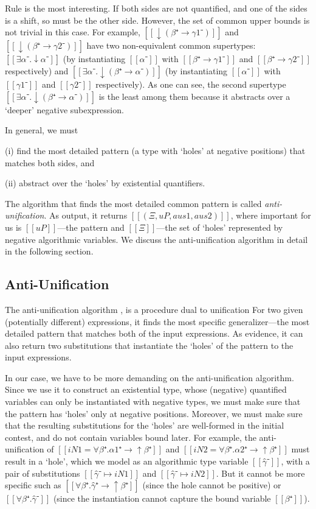 Rule  is the most 
interesting. If both sides are not quantified, and one of the sides is 
a shift, so must be the other side. 
However, the set of common upper bounds is not trivial in this case.
For example, $[[↓(β⁺ → γ1⁻)]]$ and $[[↓(β⁺ → γ2⁻)]]$ have
two non-equivalent common supertypes: 
$[[∃α⁻.↓α⁻]]$ 
(by instantiating $[[α⁻]]$ with $[[β⁺ → γ1⁻]]$ and $[[β⁺ → γ2⁻]]$ respectively)
and 
$[[∃α⁻.↓(β⁺ → α⁻)]]$ 
(by instantiating $[[α⁻]]$ with $[[γ1⁻]]$ and $[[γ2⁻]]$ respectively).
As one can see, the second supertype $[[∃α⁻.↓(β⁺ → α⁻)]]$ is the least among them
because it abstracts over a `deeper' negative subexpression.

In general, we must 
\begin{itemize*}
  \item[(i)] find the most detailed pattern (a type with `holes' at negative positions) 
    that matches both sides, and 
  \item[(ii)] abstract over the `holes' by existential quantifiers.
\end{itemize*}
The algorithm that finds the most detailed common pattern is called \emph{anti-unification}.
As output, it returns $[[(Ξ, uP, aus1, aus2)]]$, where important for us is
$[[uP]]$---the pattern and $[[Ξ]]$---the set of `holes' represented by negative algorithmic variables.
We discuss the anti-unification algorithm in detail in the following section.


\subsection{Anti-Unification}

The anti-unification algorithm \cite{todo}, 
is a procedure dual to unification
For two given (potentially different) expressions, 
it finds the most specific generalizer---the most detailed pattern that 
matches both of the input expressions. As evidence, it can also return 
two substitutions that instantiate the `holes' of the pattern to the input expressions.

In our case, we have to be more demanding on the anti-unification algorithm.
Since we use it to construct an existential type, whose (negative) quantified variables
can only be instantiated with negative types, we must make sure that the pattern 
has `holes' only at negative positions. Moreover, we must make sure that
the resulting substitutions for the `holes' are well-formed in the initial contest, 
and do not contain variables bound later. For example, 
the anti-unification of $[[iN1 = ∀β⁺.α1⁺ → ↑β⁺]]$ and
$[[iN2 = ∀β⁺.α2⁺ → ↑β⁺]]$
must result in a `hole', which we model as an algorithmic type variable $[[γ̂⁻]]$, 
with a pair of substitutions $[[γ̂⁻ ↦ iN1]]$ and $[[γ̂⁻ ↦ iN2]]$.
But it cannot be more specific such as
$[[∀β⁺.γ̂⁺ → ↑β⁺]]$ (since the hole cannot be positive)
or $[[∀β⁺.γ̂⁻]]$ 
(since the instantiation cannot capture the bound variable $[[β⁺]]$).

